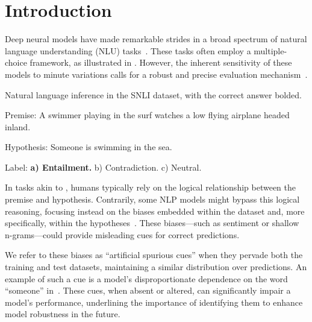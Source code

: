 \section{Introduction}
\label{sec:intro}

Deep neural models have made remarkable strides in a broad spectrum 
of natural language understanding (NLU) 
tasks~\cite{bowman2015large,wang2018glue,mostafazadeh2016corpus,roemmele2011choice,zellers2018swag}. 
These tasks often employ a multiple-choice framework, as illustrated in . 
However, the inherent sensitivity of these models to minute variations 
calls for a robust and precise evaluation mechanism~\cite{checklist2020acl}.

\begin{center}
\begin{example}\label{exp:snli}
Natural language inference in the SNLI dataset, with the correct answer bolded.
\begin{description}
\item{Premise:} A swimmer playing in the surf watches a low flying airplane headed inland.
\item{Hypothesis:} Someone is swimming in the sea.
\item{Label:} \textbf{a) Entailment.} b) Contradiction. c) Neutral.
\end{description}
\end{example}
\end{center}

In tasks akin to , humans typically rely on the 
logical relationship between the premise and hypothesis. 
Contrarily, some NLP models might bypass this logical reasoning, 
focusing instead on the biases embedded within the dataset and, 
more specifically, within the hypotheses~\cite{naik2018stress,schuster2019towards}. 
These biases—such as sentiment or shallow n-grams—could provide misleading cues for correct predictions.

We refer to these biases as ``artificial spurious cues'' 
when they pervade both the training and test datasets, 
maintaining a similar distribution over predictions. 
An example of such a cue is a model's disproportionate 
dependence on the word ``someone'' in~. 
These cues, when absent or altered, can significantly impair a model's performance, 
underlining the importance of identifying them to enhance model robustness in the future.

